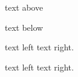 \documentclass{article}
\newcommand{\getdetail}[1]{\ignorespaces}
\begin{document}
text above

\getdetail{hello}

text below

text left \getdetail{I-am-lol} text right.

text left text right.
\end{document}

